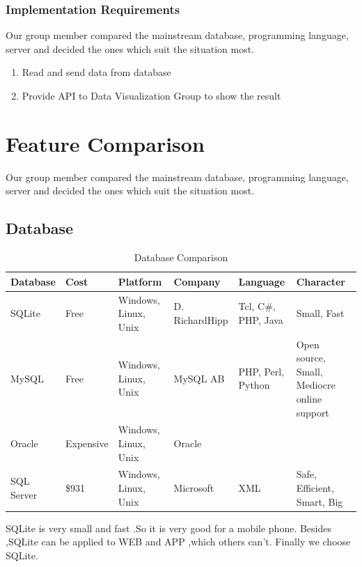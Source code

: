 \documentclass{article}
\begin{document}
\subsubsection{Implementation Requirements}
Our group member compared the mainstream database, programming language, server and decided the ones which suit the situation most. 

\begin{enumerate}
	\item Read and send data from database
	\item Provide API to Data Visualization Group to show the result
\end{enumerate}


\section{Feature Comparison}
Our group member compared the mainstream database, programming language, server and decided the ones which suit the situation most. 
\subsection{Database}

\begin{table}[htbp]
\centering
  \begin{tabular}{|l|l|p{2cm}|p{2cm}|p{2cm}|p{2cm}|}
  \hline
   Database & Cost & Platform & Company & Language & Character\\
    \hline
   SQLite & Free & Windows, Linux, Unix & D. RichardHipp & Tcl, C\#, PHP, Java & Small, Fast\\
    \hline

   MySQL & Free & Windows, Linux, Unix & MySQL AB & PHP, Perl, Python & Open source, Small, Mediocre online support \\
       \hline

   Oracle & Expensive & Windows, Linux, Unix & Oracle & &\\   
       \hline
	SQL Server & \$931 & Windows, Linux, Unix & Microsoft & XML & Safe, Efficient, Smart, Big \\
	\hline
     \end{tabular}
  \caption{Database Comparison}
\end{table}

SQLite is very small and fast .So it is very good for a mobile phone. Besides ,SQLite can be applied to WEB and APP ,which others can’t. Finally we choose SQLite.
\end{document}
